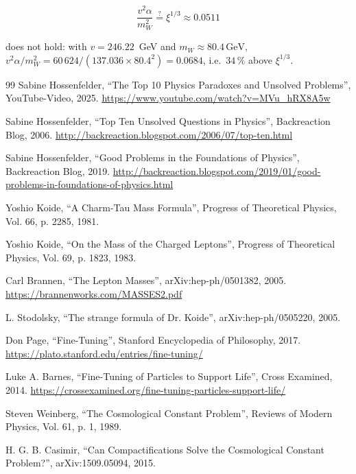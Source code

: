 	\begin{equation}
		\frac{v^2 \alpha}{m_W^2} \overset{?}{=} \xi^{1/3} \approx 0.0511
	\end{equation}
	
	does not hold: with $v = 246.22$~GeV and $m_W \approx 80.4\,\si{\giga\electronvolt}$, $v^2\alpha/m_W^2 = 60\,624/(137.036\times80.4^2) = 0.0684$, i.e.\ $34\,\%$ above $\xi^{1/3}$.

	\begin{thebibliography}{99}
		 Sabine Hossenfelder, ``The Top 10 Physics Paradoxes and Unsolved Problems'', YouTube-Video, 2025. \url{https://www.youtube.com/watch?v=MVu_hRX8A5w}
		
		 Sabine Hossenfelder, ``Top Ten Unsolved Questions in Physics'', Backreaction Blog, 2006. \url{http://backreaction.blogspot.com/2006/07/top-ten.html}
		
		 Sabine Hossenfelder, ``Good Problems in the Foundations of Physics'', Backreaction Blog, 2019. \url{http://backreaction.blogspot.com/2019/01/good-problems-in-foundations-of-physics.html}
		
		 Yoshio Koide, ``A Charm-Tau Mass Formula'', Progress of Theoretical Physics, Vol. 66, p. 2285, 1981.
		
		 Yoshio Koide, ``On the Mass of the Charged Leptons'', Progress of Theoretical Physics, Vol. 69, p. 1823, 1983.
		
		 Carl Brannen, ``The Lepton Masses'', arXiv:hep-ph/0501382, 2005. \url{https://brannenworks.com/MASSES2.pdf}
		
		 L. Stodolsky, ``The strange formula of Dr. Koide'', arXiv:hep-ph/0505220, 2005.
		
		 Don Page, ``Fine-Tuning'', Stanford Encyclopedia of Philosophy, 2017. \url{https://plato.stanford.edu/entries/fine-tuning/}
		
		 Luke A. Barnes, ``Fine-Tuning of Particles to Support Life'', Cross Examined, 2014. \url{https://crossexamined.org/fine-tuning-particles-support-life/}
		
		 Steven Weinberg, ``The Cosmological Constant Problem'', Reviews of Modern Physics, Vol. 61, p. 1, 1989.
		
		 H. G. B. Casimir, ``Can Compactifications Solve the Cosmological Constant Problem?'', arXiv:1509.05094, 2015.
		

\end{thebibliography}
